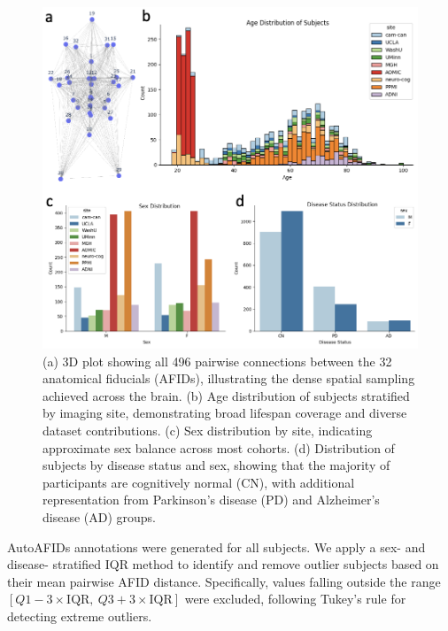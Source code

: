 \begin{figure}[hbt!]
    \centering
    \includegraphics[width=1\linewidth]{figs/ch3_Figure_pairwisedata.png}
    \caption{(a) 3D plot showing all 496 pairwise connections between the 32 anatomical fiducials (AFIDs), illustrating the dense spatial sampling achieved across the brain. (b) Age distribution of subjects stratified by imaging site, demonstrating broad lifespan coverage and diverse dataset contributions. (c) Sex distribution by site, indicating approximate sex balance across most cohorts. (d) Distribution of subjects by disease status and sex, showing that the majority of participants are cognitively normal (CN), with additional representation from Parkinson’s disease (PD) and Alzheimer’s disease (AD) groups.
}
    \label{fig:ch3_Figure_pairwisedata}
\end{figure}

AutoAFIDs annotations were generated for all subjects. We apply a sex- and disease- stratified IQR method to identify and remove outlier subjects based on their mean pairwise AFID distance. Specifically, values falling outside the range \( [Q1 - 3 \times \text{IQR},\ Q3 + 3 \times \text{IQR}] \) were excluded, following Tukey’s rule for detecting extreme outliers.

